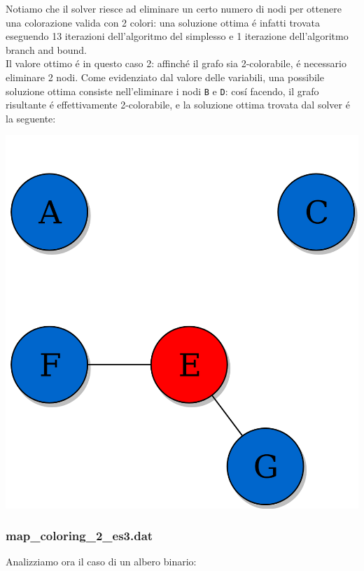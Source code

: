 \documentclass{article}
\begin{document}
Notiamo che il solver riesce ad eliminare un certo numero di nodi per ottenere una colorazione valida con 2 colori: una soluzione ottima \'e infatti trovata eseguendo 13 iterazioni dell'algoritmo del simplesso e 1 iterazione dell'algoritmo branch and bound.\\
Il valore ottimo \'e in questo caso 2: affinch\'e il grafo sia 2-colorabile, \'e necessario eliminare 2 nodi. Come evidenziato dal valore delle variabili, una possibile soluzione ottima consiste nell'eliminare i nodi \texttt{B} e \texttt{D}: cos\'i facendo, il grafo risultante \'e effettivamente 2-colorabile, e la soluzione ottima trovata dal solver \'e la seguente:\\

\begin{center}
\includegraphics[scale=0.2]{non_complete_graph_coloured2.png}
\end{center}

\pagebreak

\subsubsection{map\_coloring\_2\_es3.dat}
Analizziamo ora il caso di un albero binario:\\
\end{document}
